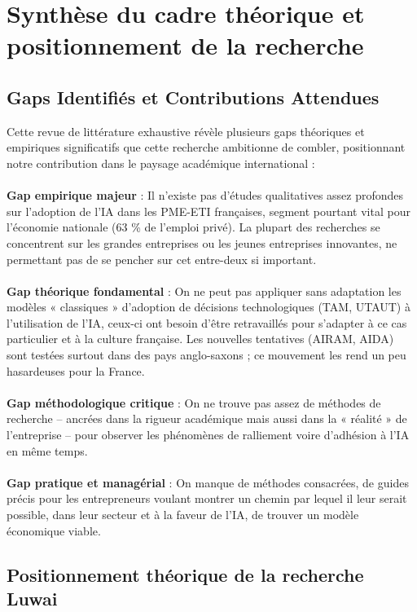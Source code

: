 \section{Synthèse du cadre théorique et positionnement de la recherche}

\subsection{Gaps Identifiés et Contributions Attendues}

Cette revue de littérature exhaustive révèle plusieurs gaps théoriques et empiriques significatifs que cette recherche ambitionne de combler, positionnant notre contribution dans le paysage académique international :
\\\\
\textbf{Gap empirique majeur} : Il n’existe pas d’études qualitatives assez profondes sur l’adoption de l’IA dans les PME-ETI françaises, segment pourtant vital pour l’économie nationale (63 \% de l’emploi privé). La plupart des recherches se concentrent sur les grandes entreprises ou les jeunes entreprises innovantes, ne permettant pas de se pencher sur cet entre-deux si important.
\\\\
\textbf{Gap théorique fondamental} : On ne peut pas appliquer sans adaptation les modèles « classiques » d’adoption de décisions technologiques (TAM, UTAUT) à l’utilisation de l’IA, ceux-ci ont besoin d’être retravaillés pour s’adapter à ce cas particulier et à la culture française. Les nouvelles tentatives (AIRAM, AIDA) sont testées surtout dans des pays anglo-saxons ; ce mouvement les rend un peu hasardeuses pour la France.
\\\\
\textbf{Gap méthodologique critique} : On ne trouve pas assez de méthodes de recherche – ancrées dans la rigueur académique mais aussi dans la « réalité » de l’entreprise – pour observer les phénomènes de ralliement voire d’adhésion à l’IA en même temps.
\\\\
\textbf{Gap pratique et managérial} : On manque de méthodes consacrées, de guides précis pour les entrepreneurs voulant montrer un chemin par lequel il leur serait possible, dans leur secteur et à la faveur de l’IA, de trouver un modèle économique viable.

\subsection{Positionnement théorique de la recherche Luwai}

